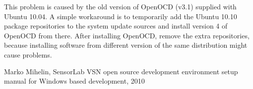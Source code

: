 \documentclass[a4paper, 10pt]{article}
\begin{document}
This problem is caused by the old version of OpenOCD (v3.1)
supplied with Ubuntu 10.04.
A simple workaround is to temporarily add the Ubuntu 10.10 package repositories
to the system update sources and install version 4 of OpenOCD from there.
After installing OpenOCD, remove the extra repositories,
because installing software from different version of the same distribution
might cause problems.


\begin{thebibliography}{9}
   Marko Mihelin, SensorLab VSN open source development environment setup manual for Windows based development,
   2010

\end{thebibliography}
\end{document}
